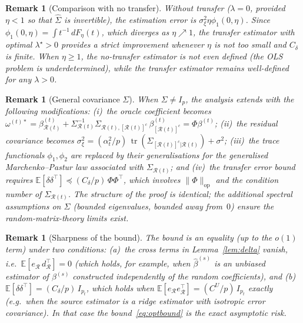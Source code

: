 \documentclass[11pt,a4paper]{article}
\newtheorem{remark}[theorem]{Remark}
\theoremstyle{definition}
\DeclareMathOperator{\tr}{tr}
\newcommand{\E}{\mathbb{E}}
\newcommand{\cR}{\mathcal{R}}
\newcommand{\cRc}{[\cR(t)]^c}
\newcommand{\ostar}{\omega^{(t)*}}
\newcommand{\bhat}{\hat{\beta}^{(s)}}
\newcommand{\SigR}{\Sigma_{\cR(t)}}
\newcommand{\SigRRc}{\Sigma_{\cR(t),\cRc}}
\newcommand{\SigcR}{\Sigma_{\cRc|\cR(t)}}
\begin{document}
\begin{remark}[Comparison with no transfer]\label{rem:notransfer}
Without transfer ($\lambda=0$, provided $\eta<1$ so that
$\hat\Sigma$ is invertible), the estimation error is
$\sigma_\xi^{2}\eta\phi_1(0,\eta)$.  Since
$\phi_1(0,\eta)=\int t^{-1}\,dF_\eta(t)$, which diverges as
$\eta\nearrow 1$, the transfer estimator with optimal
$\lambda^{\star}>0$ provides a strict improvement whenever
$\eta$ is not too small and $C_\delta$ is finite.  When $\eta\ge 1$,
the no-transfer estimator is not even defined (the OLS problem is
underdetermined), while the transfer estimator remains well-defined
for any $\lambda>0$.
\end{remark}

\begin{remark}[General covariance $\Sigma$]\label{rem:general_Sigma}
When $\Sigma\neq I_p$, the analysis extends with the following
modifications:
(i)~the oracle coefficient becomes
$\ostar=\beta^{(t)}_{\cR(t)}
+\SigR^{-1}\SigRRc\,\beta^{(t)}_{\cRc}=\Phi\beta^{(t)}$;
(ii)~the residual covariance becomes
$\sigma_\xi^{2}=(\alpha_t^{2}/p)\,\tr(\SigcR)+\sigma^{2}$;
(iii)~the trace functionals $\phi_1,\phi_2$ are replaced by
their generalisations for the generalised Marchenko--Pastur law
associated with $\SigR$; and
(iv)~the transfer error bound requires
$\E[\delta\delta^{\top}]\preceq(C_\delta/p)\,\Phi\Phi^{\top}$,
which involves $\|\Phi\|_{\mathrm{op}}$ and the condition number
of $\SigR$.  The structure of the proof is identical; the additional
spectral assumptions on $\Sigma$ (bounded eigenvalues, bounded away
from~$0$) ensure the random-matrix-theory limits exist.
\end{remark}

\begin{remark}[Sharpness of the bound]\label{rem:sharp}
The bound is an \emph{equality} (up to the $o(1)$ term) under two
conditions:
(a)~the cross terms in Lemma~\ref{lem:delta} vanish, i.e.\
$\E[e_{\cR}\,d_{\cR}^{\top}]=0$ (which holds, for example, when
$\bhat$ is an unbiased estimator of $\beta^{(s)}$ constructed
independently of the random coefficients), and
(b)~$\E[\delta\delta^{\top}]=(C_\delta/p)\,I_{p_t}$, which holds
when $\E[e_{\cR}e_{\cR}^{\top}]=(C^{U}/p)\,I_{p_t}$ exactly
(e.g.\ when the source estimator is a ridge estimator with isotropic
error covariance).
In that case the bound~\eqref{eq:optbound} is the exact asymptotic
risk.
\end{remark}
\end{document}
